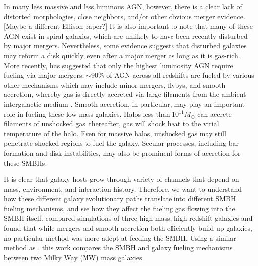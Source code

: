 \documentclass[manuscript]{aastex}
\begin{document}
In many less massive and less luminous AGN, however, there is a clear lack of distorted morphologies, close neighbors, and/or other obvious merger evidence.  \citep{Ryan2007,Schawinski2011,Ellison2013,Hicks2013}[Maybe a different Ellison paper?] It is also important to note that many of these AGN exist in spiral galaxies, which are unlikely to have been recently disturbed by major mergers. \citep[Which 1990's Tremaine?]{Springel2005,Kocevski2011} Nevertheless, some evidence suggests \citep{vanGorkom1997,Governato2009} that disturbed galaxies may reform a disk quickly, even after a major merger as long as it is gas-rich. More recently, \cite{Treister2012} has suggested that only the highest luminosity AGN require fueling via major mergers; $\sim$90\% of AGN across all redshifts are fueled by various other mechanisms which may include minor mergers, flybys, and smooth accretion, whereby gas is directly accreted via large filaments from the ambient intergalactic medium \citep{Cox2006,Bellovary2013,Sinha2012}. 
Smooth accretion, in particular, may play an important role in fueling these low mass galaxies. Halos less than 10$^{11} M_{\odot}$ can accrete filaments of unshocked gas; thereafter, gas will shock heat to the virial temperature of the halo. \citep{Keres2005} Even for massive halos, unshocked gas may still penetrate shocked regions to fuel the galaxy. \citep{Brooks2007,Dekel2009,Nelson2013} Secular processes, including bar formation and disk instabilities, may also be prominent forms of accretion for these SMBHs. \citep{Kormendy2013}   

	
It is clear that galaxy hosts grow through variety of channels that depend on mass, environment, and interaction history. Therefore, we want to understand how these different galaxy evolutionary paths translate into different SMBH fueling mechanisms, and see how they affect the fueling gas flowing into the SMBH itself. \cite{Bellovary2013} compared simulations of three high mass, high redshift galaxies and found that while mergers and smooth accretion both efficiently build up galaxies, no particular method was more adept at feeding the SMBH. Using a similar method as \cite{Bellovary2013}, this work compares the SMBH and galaxy fueling mechanisms between two Milky Way (MW) mass galaxies. 
	
\end{document}

